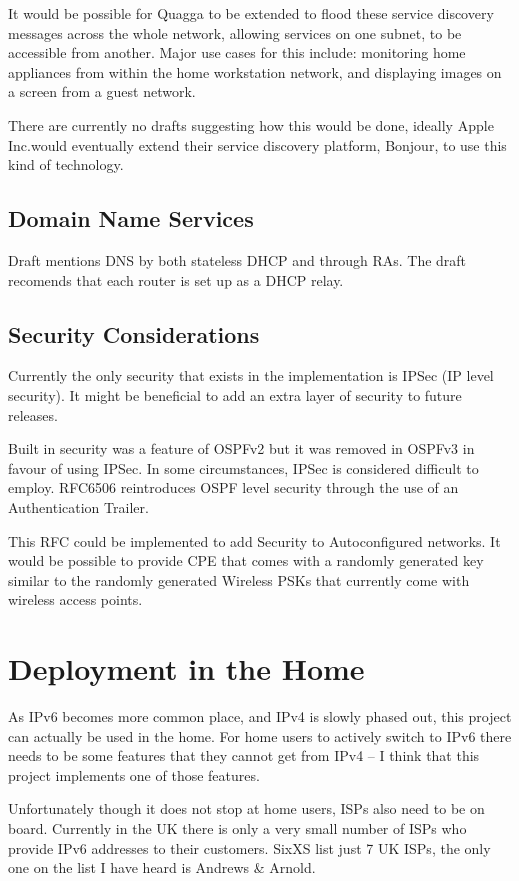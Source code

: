 \documentclass[12pt]{report}
\begin{document}
It would be possible for Quagga to be extended to flood these service discovery
messages across the whole network, allowing services on one subnet, to be
accessible from another. Major use cases for this include: monitoring home
appliances from within the home workstation network, and displaying images on a
screen from a guest network.

There are currently no drafts suggesting how this would be done, ideally Apple
Inc.\@ would eventually extend their service discovery platform, Bonjour, to
use this kind of technology.

\subsection{Domain Name Services}
Draft mentions DNS by both stateless DHCP and through RAs. The draft recomends
that each router is set up as a DHCP relay.

\subsection{Security Considerations}
Currently the only security that exists in the implementation is IPSec (IP
level security). It might be beneficial to add an extra layer of security to future 
releases.

Built in security was a feature of OSPFv2 but it was removed in OSPFv3 in favour of 
using IPSec. In some circumstances, IPSec is considered difficult to employ. 
RFC6506 reintroduces OSPF level security through the use of an Authentication 
Trailer. 

This RFC could be implemented to add Security to Autoconfigured networks. It would 
be possible to provide CPE that comes with a randomly generated key similar to the 
randomly generated Wireless PSKs that currently come with wireless access points.

\section{Deployment in the Home}
As IPv6 becomes more common place, and IPv4 is slowly phased out, this project can 
actually be used in the home. For home users to actively switch to IPv6 there needs 
to be some features that they cannot get from IPv4 -- I think that this project 
implements one of those features.

Unfortunately though it does not stop at home users, ISPs also need to be on
board.  Currently in the UK there is only a very small number of ISPs who
provide IPv6 addresses to their customers. SixXS list just 7 UK ISPs, the only
one on the list I have heard is Andrews \& Arnold.
\end{document}
